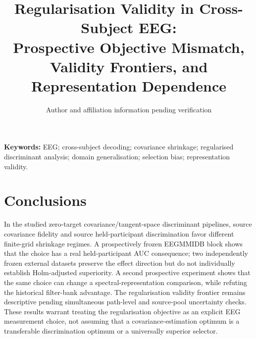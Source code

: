 \documentclass[11pt,a4paper]{article}
\title{Regularisation Validity in Cross-Subject EEG:\\
Prospective Objective Mismatch, Validity Frontiers, and Representation Dependence}
\author{Author and affiliation information pending verification}
\date{}
\begin{document}
\maketitle

\noindent\textbf{Keywords:} EEG; cross-subject decoding; covariance shrinkage;
regularised discriminant analysis; domain generalisation; selection bias;
representation validity.





\section{Conclusions}
In the studied zero-target covariance/tangent-space discriminant pipelines,
source covariance fidelity and source held-participant discrimination favor
different finite-grid shrinkage regimes. A prospectively frozen EEGMMIDB block
shows that the choice has a real held-participant AUC consequence; two
independently frozen external datasets preserve the effect direction but do
not individually establish Holm-adjusted superiority. A second prospective
experiment shows that the same choice can change a spectral-representation
comparison, while refuting the historical filter-bank advantage. The
regularisation validity frontier remains descriptive pending simultaneous
path-level and source-pool uncertainty checks. These results warrant
treating the regularisation objective as an explicit EEG measurement choice,
not assuming that a covariance-estimation optimum is a transferable
discrimination optimum or a universally superior selector.
\clearpage




\end{document}
